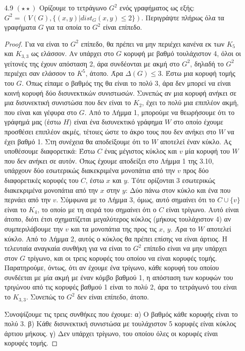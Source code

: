 \documentclass[a4paper, oneside, 11pt]{article}
\theoremstyle{definition}
\begin{document}
\begin{enumerate}
\item[4.9 $(\star\star)$]
	Ορίζουμε το τετράγωνο $G^2$ ενός γραφήματος ως εξής: $G^2 = (V(G), \{(x,y) | dist_G (x,y) \leq 2\})$. Περιγράψτε πλήρως όλα τα γραφήματα $G$ για τα οποία το $G^2$ είναι επίπεδο.
	\begin{proof}
Για να είναι το $G^2$ επίπεδο, θα πρέπει να μην περιέχει κανένα εκ των $K_5$ και $K_{3,3}$ ως ελάσσον. Αν υπάρχει στο $G$ κορυφή με βαθμό τουλάχιστον 4, όλοι οι γείτονές της έχουν απόσταση 2, άρα συνδέονται
με ακμή στο $G^2$, δηλαδή το $G^2$ περιέχει σαν ελάσσον το $K^5$, άτοπο. Άρα $\Delta (G)\leq 3$. Έστω μια κορυφή τομής του $G$. Όπως είπαμε ο βαθμός της θα είναι το πολύ 3, άρα δεν μπορεί να είναι κοινή
κορυφή δύο δισυνεκτικών συνιστωσών. Συνεπώς αν μια κορυφή ανήκει σε μια δισυνεκτική συνιστώσα που δεν είναι το $K_2$, έχει το πολύ μια επιπλέον ακμή, που είναι και γέφυρα στο $G$. Από το Λήμμα 1,
μπορούμε να θεωρήσουμε ότι το γράφημά μας (έστω $H$) είναι ένα δισυνεκτικό γράφημα $W$ στο οποίο έχουμε προσθέσει επιπλέον ακμές, τέτοιες ώστε το άκρο τους που δεν ανήκει στο $W$ να έχει βαθμό 1.
Στη συνέχεια θα αποδείξουμε ότι το $W$ αποτελεί έναν κύκλο. Ας υποθέσουμε διαφορετικά: Έστω $C$ ένας μέγιστος κύκλος και $v$ μία κορυφή του $W$ που δεν ανήκει σε αυτόν. Όπως έχουμε αποδείξει στο Λήμμα 1
της 3.10, υπάρχουν δύο εσωτερικώς διακεκριμένα μονοπάτια από την $v$ προς δύο διαφορετικές κορυφές του $C$, έστω $x$ και $y$. Τότε ορίζονται 3 εσωτερικώς διακεκριμένα μονοπάτια από την $x$ στην $y$: Δύο
πάνω στον κύκλο και ένα που περνάει από την $v$. Σύμφωνα με το Λήμμα 3, όμως, αυτό σημαίνει ότι το $C\cup \{v\}$ είναι το $K_4$, το οποίο με τη σειρά του σημαίνει ότι ο $C$ είναι τρίγωνο. Αυτό είναι άτοπο,
διότι έτσι σχηματίζεται μεγαλύτερος κύκλος (μήκους τουλάχιστον 4) αν συμπεριλάβουμε την $v$ και τα μονοπάτια της προς τις $x$, $y$. Άρα το $W$ αποτελεί κύκλο. Από το Λήμμα 2, αυτός ο κύκλος θα πρέπει επίσης
να είναι άρτιος. Η τελευταία αναγκαία συνθήκη για να είναι το $G^2$ επίπεδο είναι να μην υπάρχει στον $G$ τρίγωνο, και οι τρεις κορυφές του οποίου να είναι κορυφές τομής. Παρατηρούμε, όντως, ότι αν έχουμε
ένα τρίγωνο, κάθε κορυφή του οποίου συνδέεται με μία ακμή με έναν κόμβο βαθμού 1, η απόσταση των κορυφών του τριγώνου από τις κορυφές βαθμού 1 είναι το πολύ 2, άρα το τετράγωνό του είναι το $K_{3,3}$.
Συνεπώς το $G^2$ δεν είναι επίπεδο, άτοπο.

Συνοψίζουμε τις τρεις συνθήκες που έχουμε:
α) Ο βαθμός κάθε κορυφής είναι το πολύ 3.
β) Κάθε δισυνεκτική συνιστώσα με τουλάχιστον 5 κορυφές είναι κύκλος άρτιου μήκους.
γ) Δεν υπάρχει τρίγωνο, του οποίου όλες οι κορυφές είναι κορυφές τομής.


\end{proof}
\end{enumerate}
\end{document}
